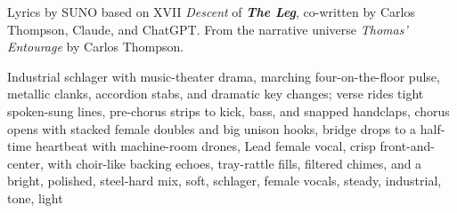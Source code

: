 
\begin{notes}
Lyrics by SUNO based on XVII \emph{Descent} of \emph{\bfseries The Leg}, %
co-written by Carlos Thompson, Claude, and ChatGPT. %
From the narrative universe \emph{Thomas’ Entourage} by Carlos Thompson.
\end{notes}
\begin{style}
Industrial schlager with music-theater drama, marching four-on-the-floor pulse, metallic clanks, accordion stabs, and dramatic key changes; verse rides tight spoken-sung lines, pre-chorus strips to kick, bass, and snapped handclaps, chorus opens with stacked female doubles and big unison hooks, bridge drops to a half-time heartbeat with machine-room drones, Lead female vocal, crisp front-and-center, with choir-like backing echoes, tray-rattle fills, filtered chimes, and a bright, polished, steel-hard mix, soft, schlager, female vocals, steady, industrial, tone, light
\end{style}
